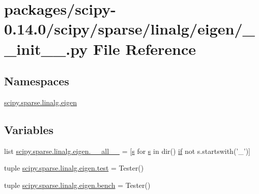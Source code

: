 \hypertarget{packages_2scipy-0_814_80_2scipy_2sparse_2linalg_2eigen_2____init_____8py}{}\section{packages/scipy-\/0.14.0/scipy/sparse/linalg/eigen/\+\_\+\+\_\+init\+\_\+\+\_\+.py File Reference}
\label{packages_2scipy-0_814_80_2scipy_2sparse_2linalg_2eigen_2____init_____8py}
\subsection*{Namespaces}
\begin{DoxyCompactItemize}
\item 
 \hyperlink{namespacescipy_1_1sparse_1_1linalg_1_1eigen}{scipy.\+sparse.\+linalg.\+eigen}
\end{DoxyCompactItemize}
\subsection*{Variables}
\begin{DoxyCompactItemize}
\item 
list \hyperlink{namespacescipy_1_1sparse_1_1linalg_1_1eigen_ada87267193e73e0b8fb11d1f19f42e53}{scipy.\+sparse.\+linalg.\+eigen.\+\_\+\+\_\+all\+\_\+\+\_\+} = \mbox{[}\hyperlink{indexexpr_8h_ae024b0db549122b44c349ae28ec990dc}{s} for \hyperlink{indexexpr_8h_ae024b0db549122b44c349ae28ec990dc}{s} in dir() \hyperlink{minmax_8h_a30a0ee9fee303f01d9c5e6f669e0dfe9}{if} not s.\+startswith('\+\_\+')\mbox{]}
\item 
tuple \hyperlink{namespacescipy_1_1sparse_1_1linalg_1_1eigen_a9c9e67647d29435fc8366aacab20853c}{scipy.\+sparse.\+linalg.\+eigen.\+test} = Tester()
\item 
tuple \hyperlink{namespacescipy_1_1sparse_1_1linalg_1_1eigen_a17db74fb45765a04d3d42aa9a9879e3c}{scipy.\+sparse.\+linalg.\+eigen.\+bench} = Tester()
\end{DoxyCompactItemize}
